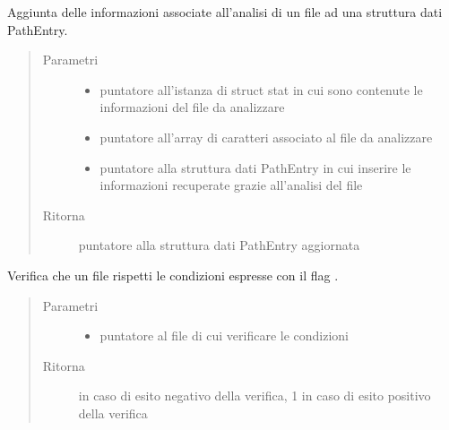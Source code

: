 \documentclass[letterpaper,10pt,italian,openany,oneside]{sphinxmanual}
\begin{document}
\begin{fulllineitems}
\label{\detokenize{documentazione:c.addFileAnalisis}}
Aggiunta delle informazioni associate all’analisi di un file ad una struttura dati PathEntry.
\begin{quote}\begin{description}
\item[{Parametri}] \leavevmode\begin{itemize}
\item {} 
 \textendash{} puntatore all’istanza di struct stat in cui sono contenute le informazioni del file da analizzare

\item {} 
 \textendash{} puntatore all’array di caratteri associato al file da analizzare

\item {} 
 \textendash{} puntatore alla struttura dati PathEntry in cui inserire le informazioni recuperate grazie all’analisi del file

\end{itemize}

\item[{Ritorna}] \leavevmode
puntatore alla struttura dati PathEntry aggiornata

\end{description}\end{quote}

\end{fulllineitems}


\begin{fulllineitems}
\label{\detokenize{documentazione:c.checkLength}}
Verifica che un file rispetti le condizioni espresse con il flag .
\begin{quote}\begin{description}
\item[{Parametri}] \leavevmode\begin{itemize}
\item {} 
 \textendash{} puntatore al file di cui verificare le condizioni

\end{itemize}

\item[{Ritorna}]  in caso di esito negativo della verifica, 1 in caso di esito positivo della verifica

\end{description}\end{quote}

\end{fulllineitems}
\end{document}
